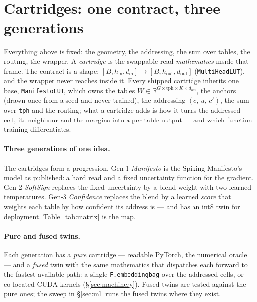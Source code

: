 \documentclass[11pt]{article}
\DeclareRobustCommand{\code}[1]{{\renewcommand{\_}{\textunderscore\allowbreak}\texttt{#1}}}
\begin{document}
\section{Cartridges: one contract, three generations}
\label{sec:cartridges}

Everything above is fixed: the geometry, the addressing, the sum over tables, the routing, the wrapper. A
\emph{cartridge} is the swappable read \emph{mathematics} inside that frame. The contract is a shape:
$[B,h_\text{in},d_\text{in}]\to[B,h_\text{out},d_\text{out}]$ (\code{MultiHeadLUT}), and the wrapper never
reaches inside it. Every shipped cartridge inherits one base, \code{ManifestoLUT}, which owns the tables
$W\in\mathbb{R}^{G\times\text{tph}\times K\times d_\text{out}}$, the anchors (drawn once from a seed and
never trained), the addressing
$(c,\,u,\,c')$, the sum over \code{tph} and the routing; what a cartridge adds is how it turns the addressed
cell, its neighbour and the margins into a per-table output --- and which function training differentiates.

\paragraph{Three generations of one idea.} The cartridges form a progression. Gen-1 \emph{Manifesto} is
the Spiking Manifesto's model as published: a hard read and a fixed uncertainty function for the
gradient. Gen-2 \emph{SoftSign} replaces the fixed uncertainty by a blend weight with two learned
temperatures. Gen-3 \emph{Confidence} replaces the blend by a learned \emph{score} that weights each table
by how confident its address is --- and has an int8 twin for deployment. Table~\ref{tab:matrix} is the map.

\paragraph{Pure and fused twins.} Each generation has a \emph{pure} cartridge --- readable PyTorch, the
numerical oracle --- and a \emph{fused} twin with the same mathematics that dispatches each forward to the
fastest available path: a single \code{F.embedding\_bag} over the addressed cells, or co-located CUDA
kernels (\S\ref{sec:machinery}). Fused twins are tested against the pure ones; the sweep in
\S\ref{sec:ml} runs the fused twins where they exist.
\end{document}
